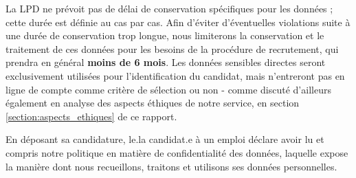  La LPD ne prévoit pas de délai de conservation spécifiques pour les données ; cette durée est définie au cas par cas. Afin d'éviter d'éventuelles violations suite à une durée de conservation trop longue, nous limiterons la conservation et le traitement de ces données  pour les besoins de la procédure de recrutement, qui prendra en général \textbf{moins de 6 mois}. Les données sensibles directes seront exclusivement utilisées pour l'identification du candidat, mais n'entreront pas en ligne de compte comme critère de sélection ou non - comme discuté d'ailleurs également en analyse des aspects éthiques de notre service, en section \ref{section:aspects_ethiques} de ce rapport.\newline
 
En déposant sa candidature, le.la candidat.e à un emploi déclare avoir lu et compris notre politique en matière de confidentialité des données, laquelle expose la manière dont nous recueillons, traitons et utilisons ses données personnelles.
